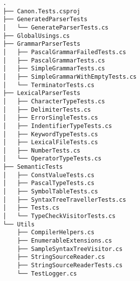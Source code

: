 \documentclass[../main.tex]{subfiles}
\begin{document}
\begin{verbatim}
.
├── Canon.Tests.csproj
├── GeneratedParserTests
│   └── GenerateParserTests.cs
├── GlobalUsings.cs
├── GrammarParserTests
│   ├── PascalGrammarFailedTests.cs
│   ├── PascalGrammarTests.cs
│   ├── SimpleGrammarTests.cs
│   ├── SimpleGrammarWithEmptyTests.cs
│   └── TerminatorTests.cs
├── LexicalParserTests
│   ├── CharacterTypeTests.cs
│   ├── DelimiterTests.cs
│   ├── ErrorSingleTests.cs
│   ├── IndentifierTypeTests.cs
│   ├── KeywordTypeTests.cs
│   ├── LexicalFileTests.cs
│   ├── NumberTests.cs
│   └── OperatorTypeTests.cs
├── SemanticTests
│   ├── ConstValueTests.cs
│   ├── PascalTypeTests.cs
│   ├── SymbolTableTests.cs
│   ├── SyntaxTreeTravellerTests.cs
│   ├── Tests.cs
│   └── TypeCheckVisitorTests.cs
└── Utils
    ├── CompilerHelpers.cs
    ├── EnumerableExtensions.cs
    ├── SampleSyntaxTreeVisitor.cs
    ├── StringSourceReader.cs
    ├── StringSourceReaderTests.cs
    └── TestLogger.cs
\end{verbatim}
\end{document}
